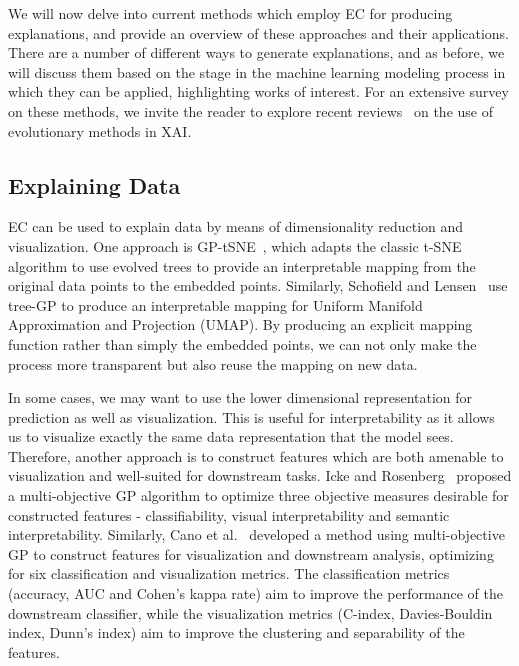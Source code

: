 \documentclass[graybox]{svmult}
\begin{document}
We will now delve into current methods which employ EC for producing explanations, 
and provide an overview of these approaches and their applications. 
There are a number of different ways to generate explanations, and as before, 
we will discuss them based on the stage in the machine learning modeling process in which they can be applied, highlighting works of interest. For an extensive survey on these methods, we invite the reader to explore recent reviews~\cite{bacarditIntersectionEvolutionaryComputation2022a, meiExplainableArtificialIntelligence2022} on the use of evolutionary methods in XAI.

\subsection{Explaining Data}

EC can be used to explain data by means of dimensionality reduction and visualization. One approach is GP-tSNE~\cite{GPinterpVis_Lensen_ITC_21}, which adapts the classic t-SNE~\cite{maatenVisualizingDataUsing2008} algorithm to use evolved trees to provide an interpretable mapping from the original data points to the embedded points. Similarly, Schofield and Lensen~\cite{schofieldUsingGeneticProgramming2021} use tree-GP to produce an interpretable mapping for Uniform Manifold Approximation and Projection (UMAP). By producing an explicit mapping function rather than simply the embedded points, we can not only make the process more transparent but also reuse the mapping on new data.

In some cases, we may want to use the lower dimensional representation for prediction as well as visualization. This is useful for interpretability as it allows us to visualize exactly the same data representation that the model sees. Therefore, another approach is to construct features which are both amenable to visualization and well-suited for downstream tasks. Icke and Rosenberg~\cite{ickeMultiobjectiveGeneticProgramming2011} proposed a multi-objective GP algorithm to optimize three objective measures desirable for constructed features - classifiability, visual interpretability and semantic interpretability. Similarly, Cano et al.~\cite{canoMultiobjectiveGeneticProgramming2017} developed a method using multi-objective GP to construct features for visualization and downstream analysis, optimizing for six classification and visualization metrics. The classification metrics (accuracy, AUC and Cohen's kappa rate) aim to improve the performance of the downstream classifier, while the visualization metrics (C-index, Davies-Bouldin index, Dunn's index) aim to improve the clustering and separability of the features.
\end{document}
